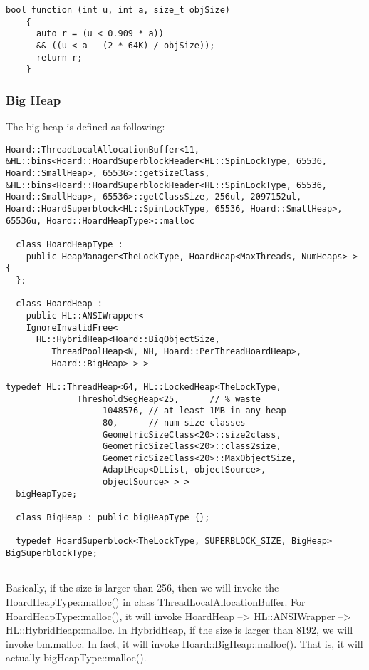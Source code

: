 \begin{lstlisting}
bool function (int u, int a, size_t objSize)
    {
      auto r = (u < 0.909 * a)) 
      && ((u < a - (2 * 64K) / objSize));
      return r;
    }
\end{lstlisting}


\subsubsection{Big Heap}

The big heap is defined as following:
\begin{lstlisting}
Hoard::ThreadLocalAllocationBuffer<11, &HL::bins<Hoard::HoardSuperblockHeader<HL::SpinLockType, 65536, Hoard::SmallHeap>, 65536>::getSizeClass, &HL::bins<Hoard::HoardSuperblockHeader<HL::SpinLockType, 65536, Hoard::SmallHeap>, 65536>::getClassSize, 256ul, 2097152ul, Hoard::HoardSuperblock<HL::SpinLockType, 65536, Hoard::SmallHeap>, 65536u, Hoard::HoardHeapType>::malloc

  class HoardHeapType :
    public HeapManager<TheLockType, HoardHeap<MaxThreads, NumHeaps> > {
  };

  class HoardHeap :
    public HL::ANSIWrapper<
    IgnoreInvalidFree<
      HL::HybridHeap<Hoard::BigObjectSize,
         ThreadPoolHeap<N, NH, Hoard::PerThreadHoardHeap>,
         Hoard::BigHeap> > >

typedef HL::ThreadHeap<64, HL::LockedHeap<TheLockType,
              ThresholdSegHeap<25,      // % waste
                   1048576, // at least 1MB in any heap
                   80,      // num size classes
                   GeometricSizeClass<20>::size2class,
                   GeometricSizeClass<20>::class2size,
                   GeometricSizeClass<20>::MaxObjectSize,
                   AdaptHeap<DLList, objectSource>,
                   objectSource> > >
  bigHeapType;
  
  class BigHeap : public bigHeapType {};
  
  typedef HoardSuperblock<TheLockType, SUPERBLOCK_SIZE, BigHeap> BigSuperblockType;
	
\end{lstlisting}


Basically, if the size is larger than 256, then we will invoke the HoardHeapType::malloc() in class ThreadLocalAllocationBuffer. For HoardHeapType::malloc(), it will invoke HoardHeap --> HL::ANSIWrapper --> HL::HybridHeap::malloc. 
In HybridHeap, if the size is larger than 8192, we will invoke bm.malloc. In fact, it will invoke Hoard::BigHeap::malloc(). That is, it will actually bigHeapType::malloc(). 

